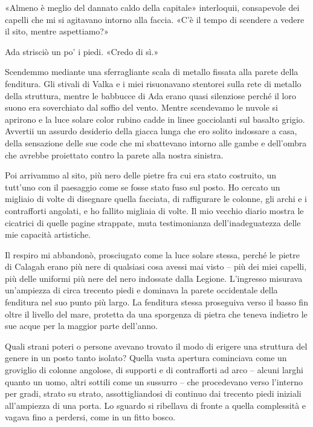 «Almeno è meglio del dannato caldo della capitale» interloquii,
consapevole dei capelli che mi si agitavano intorno alla faccia. «C'è il
tempo di scendere a vedere il sito, mentre aspettiamo?»

Ada strisciò un po' i piedi. «Credo di sì.»

Scendemmo mediante una sferragliante scala di metallo fissata alla
parete della fenditura. Gli stivali di Valka e i miei risuonavano
stentorei sulla rete di metallo della struttura, mentre le babbucce di
Ada erano quasi silenziose perché il loro suono era soverchiato dal
soffio del vento. Mentre scendevamo le nuvole si aprirono e la luce
solare color rubino cadde in linee gocciolanti sul basalto grigio.
Avvertii un assurdo desiderio della giacca lunga che ero solito
indossare a casa, della sensazione delle sue code che mi sbattevano
intorno alle gambe e dell'ombra che avrebbe proiettato contro la parete
alla nostra sinistra.

Poi arrivammo al sito, più nero delle pietre fra cui era stato
costruito, un tutt'uno con il paesaggio come se fosse stato fuso sul
posto. Ho cercato un migliaio di volte di disegnare quella facciata, di
raffigurare le colonne, gli archi e i contrafforti angolati, e ho
fallito migliaia di volte. Il mio vecchio diario mostra le cicatrici di
quelle pagine strappate, muta testimonianza dell'inadeguatezza delle mie
capacità artistiche.

Il respiro mi abbandonò, prosciugato come la luce solare stessa, perché
le pietre di Calagah erano più nere di qualsiasi cosa avessi mai visto
-- più dei miei capelli, più delle uniformi più nere del nero indossate
dalla Legione. L'ingresso misurava un'ampiezza di circa trecento piedi e
dominava la parete occidentale della fenditura nel suo punto più largo.
La fenditura stessa proseguiva verso il basso fin oltre il livello del
mare, protetta da una sporgenza di pietra che teneva indietro le sue
acque per la maggior parte dell'anno.

Quali strani poteri o persone avevano trovato il modo di erigere una
struttura del genere in un posto tanto isolato? Quella vasta apertura
cominciava come un groviglio di colonne angolose, di supporti e di
contrafforti ad arco -- alcuni larghi quanto un uomo, altri sottili come
un sussurro -- che procedevano verso l'interno per gradi, strato su
strato, assottigliandosi di continuo dai trecento piedi iniziali
all'ampiezza di una porta. Lo sguardo si ribellava di fronte a quella
complessità e vagava fino a perdersi, come in un fitto bosco.

